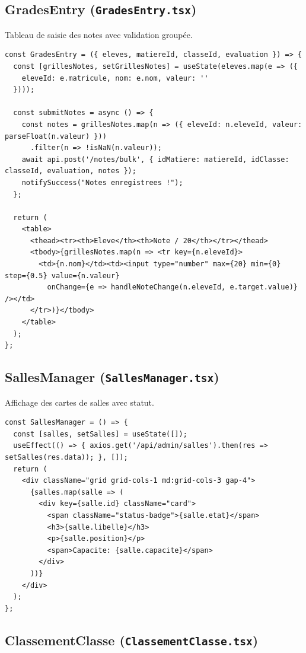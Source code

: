 \documentclass[12pt,a4paper]{article}
\begin{document}
\subsection{GradesEntry (\texttt{GradesEntry.tsx})}

Tableau de saisie des notes avec validation groupée.

\begin{lstlisting}[style=code]
const GradesEntry = ({ eleves, matiereId, classeId, evaluation }) => {
  const [grillesNotes, setGrillesNotes] = useState(eleves.map(e => ({
    eleveId: e.matricule, nom: e.nom, valeur: ''
  })));

  const submitNotes = async () => {
    const notes = grillesNotes.map(n => ({ eleveId: n.eleveId, valeur: parseFloat(n.valeur) }))
      .filter(n => !isNaN(n.valeur));
    await api.post('/notes/bulk', { idMatiere: matiereId, idClasse: classeId, evaluation, notes });
    notifySuccess("Notes enregistrees !");
  };

  return (
    <table>
      <thead><tr><th>Eleve</th><th>Note / 20</th></tr></thead>
      <tbody>{grillesNotes.map(n => <tr key={n.eleveId}>
        <td>{n.nom}</td><td><input type="number" max={20} min={0} step={0.5} value={n.valeur}
          onChange={e => handleNoteChange(n.eleveId, e.target.value)} /></td>
      </tr>)}</tbody>
    </table>
  );
};
\end{lstlisting}

\subsection{SallesManager (\texttt{SallesManager.tsx})}

Affichage des cartes de salles avec statut.

\begin{lstlisting}[style=code]
const SallesManager = () => {
  const [salles, setSalles] = useState([]);
  useEffect(() => { axios.get('/api/admin/salles').then(res => setSalles(res.data)); }, []);
  return (
    <div className="grid grid-cols-1 md:grid-cols-3 gap-4">
      {salles.map(salle => (
        <div key={salle.id} className="card">
          <span className="status-badge">{salle.etat}</span>
          <h3>{salle.libelle}</h3>
          <p>{salle.position}</p>
          <span>Capacite: {salle.capacite}</span>
        </div>
      ))}
    </div>
  );
};
\end{lstlisting}

\subsection{ClassementClasse (\texttt{ClassementClasse.tsx})}
\end{document}
